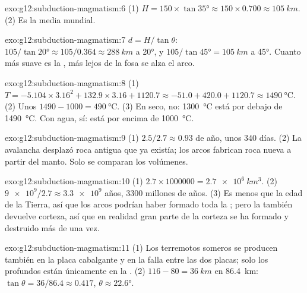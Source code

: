 \begin{solution}{exo:g12:subduction-magmatism:6}
(1) $H = 150 \times \tan\ang{35} \approx 150 \times 0.700 \approx
\qty{105}{km}$. (2) Es la media mundial.
\end{solution}

\begin{solution}{exo:g12:subduction-magmatism:7}
$d = H/\tan\theta$: $105/\tan\ang{20} \approx 105/0.364 \approx
\qty{288}{km}$ a \ang{20}, y $105/\tan\ang{45} = \qty{105}{km}$ a
\ang{45}. Cuanto más suave es la , más lejos de la fosa se alza el arco.
\end{solution}

\begin{solution}{exo:g12:subduction-magmatism:8}
(1) $T = -5.104 \times 3.16^2 + 132.9 \times 3.16 + 1120.7 \approx -51.0 +
420.0 + 1120.7 \approx \qty{1490}{\celsius}$. (2) Unos $1490 - 1000 =
\qty{490}{\celsius}$. (3) En seco, no: \qty{1300}{\celsius} está por debajo de
\qty{1490}{\celsius}. Con agua, sí: está por encima de \qty{1000}{\celsius}.
\end{solution}

\begin{solution}{exo:g12:subduction-magmatism:9}
(1) $2.5/2.7 \approx 0.93$ de año, unos 340 días. (2) La avalancha desplazó
roca antigua que ya existía; los arcos fabrican roca nueva a partir del manto.
Solo se comparan los volúmenes.
\end{solution}

\begin{solution}{exo:g12:subduction-magmatism:10}
(1) $2.7 \times \num{1000000} = \qty{2.7e6}{km^3}$. (2) $\num{9e9}/2.7
\approx \num{3.3e9}$ años, 3300 millones de años. (3) Es menos que la edad de
la Tierra, así que los arcos podrían haber formado toda la ; pero la  también devuelve corteza, así que en realidad
gran parte de la corteza se ha formado y destruido más de una vez.
\end{solution}

\begin{solution}{exo:g12:subduction-magmatism:11}
(1) Los terremotos someros se producen también en la placa cabalgante y en la
falla entre las dos placas; solo los profundos están únicamente en la .
(2) $116 - 80 = \qty{36}{km}$ en \qty{86.4}{km}: $\tan\theta = 36/86.4
\approx 0.417$, $\theta \approx \ang{22.6}$.
\end{solution}

